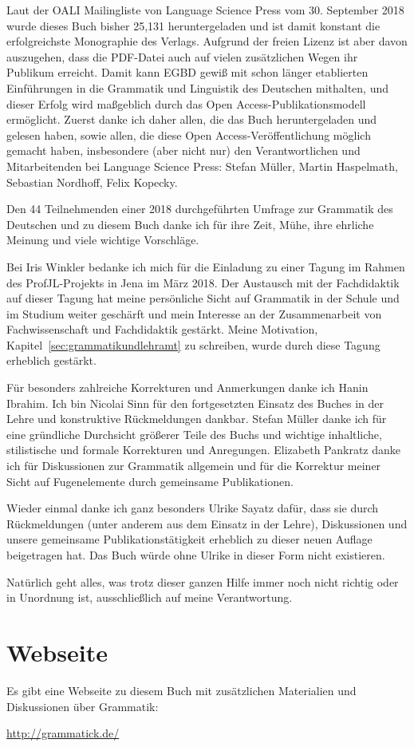 Laut der OALI Mailingliste von Language Science Press vom 30. September 2018 wurde dieses Buch bisher 25,131 heruntergeladen und ist damit konstant die erfolgreichste Monographie des Verlags.
Aufgrund der freien Lizenz ist aber davon auszugehen, dass die PDF-Datei auch auf vielen zusätzlichen Wegen ihr Publikum erreicht.
Damit kann \mbox{EGBD} gewiß mit schon länger etablierten Einführungen in die Grammatik und Linguistik des Deutschen mithalten, und dieser Erfolg wird maßgeblich durch das Open Access-Publikationsmodell ermöglicht.
Zuerst danke ich daher allen, die das Buch heruntergeladen und gelesen haben, sowie allen, die diese Open Access-Veröffentlichung möglich gemacht haben, insbesondere (aber nicht nur) den Verantwortlichen und Mitarbeitenden bei Language Science Press: Stefan Müller, Martin Haspelmath, Sebastian Nordhoff, Felix Kopecky.

Den 44 Teilnehmenden einer 2018 durchgeführten Umfrage zur Grammatik des Deutschen und zu diesem Buch danke ich für ihre Zeit, Mühe, ihre ehrliche Meinung und viele wichtige Vorschläge.

Bei Iris Winkler bedanke ich mich für die Einladung zu einer Tagung im Rahmen des ProfJL-Projekts in Jena im März 2018.
Der Austausch mit der Fachdidaktik auf dieser Tagung hat meine persönliche Sicht auf Grammatik in der Schule und im Studium weiter geschärft und mein Interesse an der Zusammenarbeit von Fachwissenschaft und Fachdidaktik gestärkt.
Meine Motivation, Kapitel~\ref{sec:grammatikundlehramt} zu schreiben, wurde durch diese Tagung erheblich gestärkt.

Für besonders zahlreiche Korrekturen und Anmerkungen danke ich Hanin Ibrahim.
Ich bin Nicolai Sinn für den fortgesetzten Einsatz des Buches in der Lehre und konstruktive Rückmeldungen dankbar.
Stefan Müller danke ich für eine gründliche Durchsicht größerer Teile des Buchs und wichtige inhaltliche, stilistische und formale Korrekturen und Anregungen.
Elizabeth Pankratz danke ich für Diskussionen zur Grammatik allgemein und für die Korrektur meiner Sicht auf Fugenelemente durch gemeinsame Publikationen.

Wieder einmal danke ich ganz besonders Ulrike Sayatz dafür, dass sie durch Rückmeldungen (unter anderem aus dem Einsatz in der Lehre), Diskussionen und unsere gemeinsame Publikationstätigkeit erheblich zu dieser neuen Auflage beigetragen hat.
Das Buch würde ohne Ulrike in dieser Form nicht existieren.

Natürlich geht alles, was trotz dieser ganzen Hilfe immer noch nicht richtig oder in Unordnung ist, ausschließlich auf meine Verantwortung.

\section*{Webseite}
\label{sec:webseite}

Es gibt eine Webseite zu diesem Buch mit zusätzlichen Materialien und Diskussionen über Grammatik:

\begin{center}
  \url{http://grammatick.de/}
\end{center}

